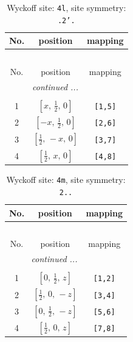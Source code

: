 \documentclass[fleqn,8pt]{jsarticle}
\begin{document}
\renewcommand{\arraystretch}{1.2}
\begin{longtable}{ccc}
\caption{Wyckoff site: {\tt 4l}, site symmetry: {\tt .2'.}}
 \\
 \hline \hline
No. & position & mapping \\ \hline \endfirsthead

\multicolumn{2}{l}{\tablename\ \thetable{}} \\
 \hline \hline
No. & position & mapping \\ \hline \endhead

 \hline \hline
\multicolumn{2}{r}{\footnotesize\it continued ...} \\ \endfoot

 \hline \hline
\multicolumn{2}{r}{} \\ \endlastfoot

1 & $\left[ x,\, \frac{1}{2},\, 0 \right]$ & {\tt [1,5]} \\ \hline
2 & $\left[ - x,\, \frac{1}{2},\, 0 \right]$ & {\tt [2,6]} \\ \hline
3 & $\left[ \frac{1}{2},\, - x,\, 0 \right]$ & {\tt [3,7]} \\ \hline
4 & $\left[ \frac{1}{2},\, x,\, 0 \right]$ & {\tt [4,8]} \\
\end{longtable}
\renewcommand{\arraystretch}{1.2}
\begin{longtable}{ccc}
\caption{Wyckoff site: {\tt 4m}, site symmetry: {\tt 2..}}
 \\
 \hline \hline
No. & position & mapping \\ \hline \endfirsthead

\multicolumn{2}{l}{\tablename\ \thetable{}} \\
 \hline \hline
No. & position & mapping \\ \hline \endhead

 \hline \hline
\multicolumn{2}{r}{\footnotesize\it continued ...} \\ \endfoot

 \hline \hline
\multicolumn{2}{r}{} \\ \endlastfoot

1 & $\left[ 0,\, \frac{1}{2},\, z \right]$ & {\tt [1,2]} \\ \hline
2 & $\left[ \frac{1}{2},\, 0,\, - z \right]$ & {\tt [3,4]} \\ \hline
3 & $\left[ 0,\, \frac{1}{2},\, - z \right]$ & {\tt [5,6]} \\ \hline
4 & $\left[ \frac{1}{2},\, 0,\, z \right]$ & {\tt [7,8]} \\
\end{longtable}
\end{document}
